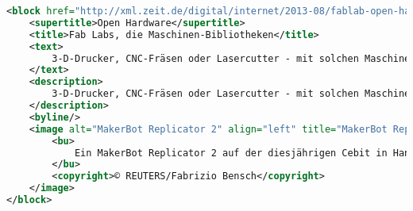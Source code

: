 \begin{lstlisting}[language= XML,caption=Das XML eines Teaserelements, label={lst:knopfxml}]
<block href="http://xml.zeit.de/digital/internet/2013-08/fablab-open-hardware" year="2013" issue="34" ressort="Digital" author="Tilman Baumgärtel" contenttype="article" publication-date="" expires="" date-last-modified="2013-08-14T12:58:40+00:00" date-first-released="2013-08-14T09:57:43.627551+00:00" date-last-published="2013-08-14T12:59:39.691370+00:00" last-semantic-change="2013-08-14T09:56:40.185797+00:00">
	<supertitle>Open Hardware</supertitle>
	<title>Fab Labs, die Maschinen-Bibliotheken</title>
	<text>
		3-D-Drucker, CNC-Fräsen oder Lasercutter - mit solchen Maschinen sollen Bastler in Fab Labs experimentieren. Immer mehr solcher Werkstätten entstehen nun in aller Welt.
	</text>
	<description>
		3-D-Drucker, CNC-Fräsen oder Lasercutter - mit solchen Maschinen sollen Bastler in Fab Labs experimentieren. Immer mehr solcher Werkstätten entstehen nun in aller Welt.
	</description>
	<byline/>
	<image alt="MakerBot Replicator 2" align="left" title="MakerBot Replicator 2" base-id="http://xml.zeit.de/digital/internet/2013-08/makerbot-cebit-hannover/" type="jpg" publication-date="" expires="">
		<bu>
			Ein MakerBot Replicator 2 auf der diesjährigen Cebit in Hannover
		</bu>
		<copyright>© REUTERS/Fabrizio Bensch</copyright>
	</image>
</block>
\end{lstlisting}

